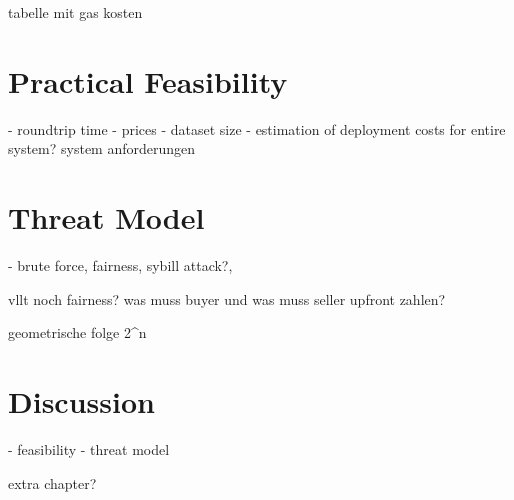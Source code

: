tabelle mit gas kosten

\section{Practical Feasibility}

- roundtrip time
- prices
- dataset size
- estimation of deployment costs for entire system? system anforderungen


\section{Threat Model}

- brute force, fairness, sybill attack?, 

vllt noch fairness? was muss buyer und was muss seller upfront zahlen?

geometrische folge 2^n

\section{Discussion}

- feasibility
- threat model

extra chapter?